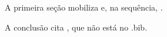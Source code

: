
A primeira seção mobiliza \cite{silva2020} e, na sequência, \autocite{souza2021}.

A conclusão cita \citep{fantasma2022}, que não está no .bib.

